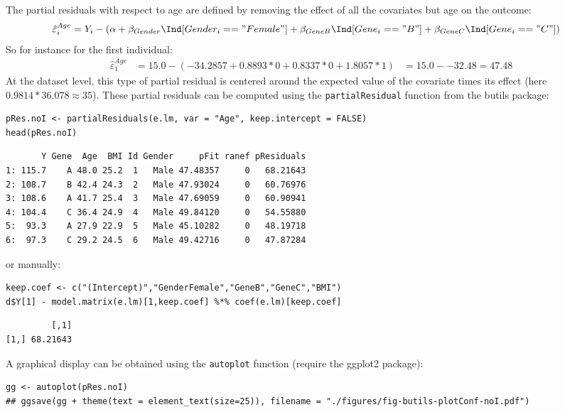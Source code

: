 \documentclass[12pt]{article}
\begin{document}
The partial residuals with respect to age are defined by removing the
effect of all the covariates but age on the outcome:
\begin{align*}
\hat{\varepsilon}^{Age}_i &= Y_i - \left(\alpha + \beta_{Gender} \Ind[Gender_i=="Female"] + \beta_{GeneB} \Ind[Gene_i=="B"] + \beta_{GeneC} \Ind[Gene_i=="C"]\right)
\end{align*}
So for instance for the first individual:
\begin{align*}
\hat{\varepsilon}^{Age}_1 &= 15.0 - \left(-34.2857 + 0.8893 * 0 + 0.8337 * 0 + 1.8057 * 1\right)
                         &= 15.0 - -32.48 = 47.48
\end{align*}
At the dataset level, this type of partial residual is centered around
the expected value of the covariate times its effect (here
\(0.9814*36.078 \approx 35\)). These partial residuals can be
computed using the \texttt{partialResidual} function from the butils package:
\lstset{language=r,label= ,caption= ,captionpos=b,numbers=none}
\begin{lstlisting}
pRes.noI <- partialResiduals(e.lm, var = "Age", keep.intercept = FALSE)
head(pRes.noI)
\end{lstlisting}

\begin{verbatim}
       Y Gene  Age  BMI Id Gender     pFit ranef pResiduals
1: 115.7    A 48.0 25.2  1   Male 47.48357     0   68.21643
2: 108.7    B 42.4 24.3  2   Male 47.93024     0   60.76976
3: 108.6    A 41.7 25.4  3   Male 47.69059     0   60.90941
4: 104.4    C 36.4 24.9  4   Male 49.84120     0   54.55880
5:  93.3    A 27.9 22.9  5   Male 45.10282     0   48.19718
6:  97.3    C 29.2 24.5  6   Male 49.42716     0   47.87284
\end{verbatim}

or manually:
\lstset{language=r,label= ,caption= ,captionpos=b,numbers=none}
\begin{lstlisting}
keep.coef <- c("(Intercept)","GenderFemale","GeneB","GeneC","BMI")
d$Y[1] - model.matrix(e.lm)[1,keep.coef] %*% coef(e.lm)[keep.coef]
\end{lstlisting}

\begin{verbatim}
         [,1]
[1,] 68.21643
\end{verbatim}

A graphical display can be obtained using the \texttt{autoplot} function
(require the ggplot2 package):
\lstset{language=r,label= ,caption= ,captionpos=b,numbers=none}
\begin{lstlisting}
gg <- autoplot(pRes.noI)
## ggsave(gg + theme(text = element_text(size=25)), filename = "./figures/fig-butils-plotConf-noI.pdf")
\end{lstlisting}
\end{document}
